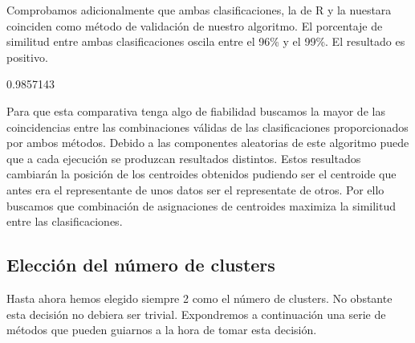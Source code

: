 \documentclass [a4paper] {article}
\begin{document}
Comprobamos adicionalmente que ambas clasificaciones, la de R y la nuestara coinciden como método de validación de nuestro algoritmo.
El porcentaje de similitud entre ambas clasificaciones oscila entre el 96\% y el 99\%.
El resultado es positivo.
\begin{Schunk}
\begin{Soutput}
[1] 0.9857143
\end{Soutput}
\end{Schunk}
Para que esta comparativa tenga algo de fiabilidad buscamos la mayor de las coincidencias entre las combinaciones válidas de las clasificaciones proporcionados por ambos métodos.
Debido a las componentes aleatorias de este algoritmo puede que a cada ejecución se produzcan resultados distintos.
Estos resultados cambiarán la posición de los centroides obtenidos pudiendo ser el centroide que antes era el representante de unos datos ser el representate de otros.
Por ello buscamos que combinación de asignaciones de centroides maximiza la similitud entre las clasificaciones.

\newpage
\subsection{Elección del número de clusters}
Hasta ahora hemos elegido siempre 2 como el número de clusters.
No obstante esta decisión no debiera ser trivial.
Expondremos a continuación una serie de métodos que pueden guiarnos a la hora de tomar esta decisión.
\end{document}
